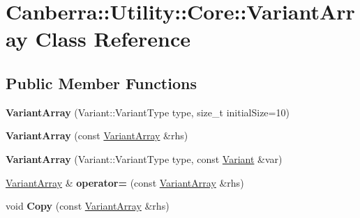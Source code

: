 \hypertarget{class_canberra_1_1_utility_1_1_core_1_1_variant_array}{}\section{Canberra\+:\+:Utility\+:\+:Core\+:\+:Variant\+Array Class Reference}
\label{class_canberra_1_1_utility_1_1_core_1_1_variant_array}
\subsection*{Public Member Functions}
\begin{DoxyCompactItemize}
\item 
\mbox{\label{class_canberra_1_1_utility_1_1_core_1_1_variant_array_ad35e4e412cd1169975e3623d0a9183b3}} 
{\bfseries Variant\+Array} (Variant\+::\+Variant\+Type type, size\+\_\+t initial\+Size=10)
\item 
\mbox{\label{class_canberra_1_1_utility_1_1_core_1_1_variant_array_a92b049b6e701afdfa8270d4960a131c7}} 
{\bfseries Variant\+Array} (const \hyperlink{class_canberra_1_1_utility_1_1_core_1_1_variant_array}{Variant\+Array} \&rhs)
\item 
\mbox{\label{class_canberra_1_1_utility_1_1_core_1_1_variant_array_a0acc723332894baf51e363ce9b9fc8a7}} 
{\bfseries Variant\+Array} (Variant\+::\+Variant\+Type type, const \hyperlink{class_canberra_1_1_utility_1_1_core_1_1_variant}{Variant} \&var)
\item 
\mbox{\label{class_canberra_1_1_utility_1_1_core_1_1_variant_array_a83a23adc0560e3d2dd70f83278a3d5c3}} 
\hyperlink{class_canberra_1_1_utility_1_1_core_1_1_variant_array}{Variant\+Array} \& {\bfseries operator=} (const \hyperlink{class_canberra_1_1_utility_1_1_core_1_1_variant_array}{Variant\+Array} \&rhs)
\item 
\mbox{\label{class_canberra_1_1_utility_1_1_core_1_1_variant_array_a33b24e798acc4f67984527544c39e842}} 
void {\bfseries Copy} (const \hyperlink{class_canberra_1_1_utility_1_1_core_1_1_variant_array}{Variant\+Array} \&rhs)

\end{DoxyCompactItemize}
